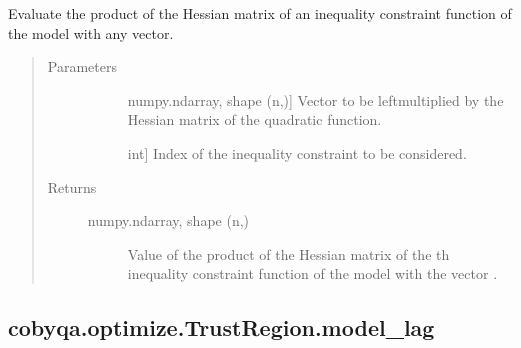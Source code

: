 \documentclass[letterpaper,10pt,english]{sphinxmanual}
\begin{document}
\begin{fulllineitems}
\begin{fulllineitems}
\label{\detokenize{refs/generated/cobyqa.optimize.TrustRegion.model_cub_hessp:cobyqa.optimize.TrustRegion.model_cub_hessp}}
\sphinxAtStartPar
Evaluate the product of the Hessian matrix of an inequality constraint
function of the model with any vector.
\begin{quote}\begin{description}
\item[{Parameters}] \leavevmode\begin{description}
\item[{}] \leavevmode{[}numpy.ndarray, shape (n,){]}
\sphinxAtStartPar
Vector to be left\sphinxhyphen{}multiplied by the Hessian matrix of the quadratic
function.

\item[{}] \leavevmode{[}int{]}
\sphinxAtStartPar
Index of the inequality constraint to be considered.

\end{description}

\item[{Returns}] \leavevmode\begin{description}
\item[{numpy.ndarray, shape (n,)}] \leavevmode
\sphinxAtStartPar
Value of the product of the Hessian matrix of the \sphinxhyphen{}th inequality
constraint function of the model with the vector .

\end{description}

\end{description}\end{quote}

\end{fulllineitems}



\subsection{cobyqa.optimize.TrustRegion.model\_lag}
\label{\detokenize{refs/generated/cobyqa.optimize.TrustRegion.model_lag:cobyqa-optimize-trustregion-model-lag}}\label{\detokenize{refs/generated/cobyqa.optimize.TrustRegion.model_lag::doc}}


\end{fulllineitems}
\end{document}
